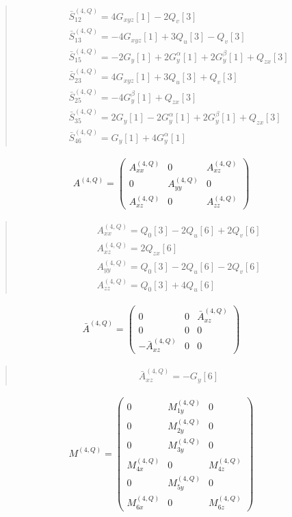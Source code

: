 \documentclass[fleqn,10pt]{jsarticle}
\begin{document}
\begin{quote}
\begin{align*}
& \bar{S}^{(4,Q)}_{12} = 4 G_{xyz}[1] - 2 Q_{v}[3] \\
& \bar{S}^{(4,Q)}_{13} = - 4 G_{xyz}[1] + 3 Q_{u}[3] - Q_{v}[3] \\
& \bar{S}^{(4,Q)}_{15} = - 2 G_{y}[1] + 2 G_{y}^{\alpha}[1] + 2 G_{y}^{\beta}[1] + Q_{zx}[3] \\
& \bar{S}^{(4,Q)}_{23} = 4 G_{xyz}[1] + 3 Q_{u}[3] + Q_{v}[3] \\
& \bar{S}^{(4,Q)}_{25} = - 4 G_{y}^{\beta}[1] + Q_{zx}[3] \\
& \bar{S}^{(4,Q)}_{35} = 2 G_{y}[1] - 2 G_{y}^{\alpha}[1] + 2 G_{y}^{\beta}[1] + Q_{zx}[3] \\
& \bar{S}^{(4,Q)}_{46} = G_{y}[1] + 4 G_{y}^{\alpha}[1]
\end{align*}
\end{quote}
\begin{align*}
A^{(4,Q)} = \begin{pmatrix} A^{(4,Q)}_{xx} & 0 & A^{(4,Q)}_{xz} \\ 0 & A^{(4,Q)}_{yy} & 0 \\ A^{(4,Q)}_{xz} & 0 & A^{(4,Q)}_{zz} \end{pmatrix}
\end{align*}
\begin{quote}
\begin{align*}
& A^{(4,Q)}_{xx} = Q_{0}[3] - 2 Q_{u}[6] + 2 Q_{v}[6] \\
& A^{(4,Q)}_{xz} = 2 Q_{zx}[6] \\
& A^{(4,Q)}_{yy} = Q_{0}[3] - 2 Q_{u}[6] - 2 Q_{v}[6] \\
& A^{(4,Q)}_{zz} = Q_{0}[3] + 4 Q_{u}[6]
\end{align*}
\end{quote}
\begin{align*}
\bar{A}^{(4,Q)} = \begin{pmatrix} 0 & 0 & \bar{A}^{(4,Q)}_{xz} \\ 0 & 0 & 0 \\ - \bar{A}^{(4,Q)}_{xz} & 0 & 0 \end{pmatrix}
\end{align*}
\begin{quote}
\begin{align*}
& \bar{A}^{(4,Q)}_{xz} = - G_{y}[6]
\end{align*}
\end{quote}
\begin{align*}
M^{(4,Q)} = \begin{pmatrix} 0 & M^{(4,Q)}_{1y} & 0 \\ 0 & M^{(4,Q)}_{2y} & 0 \\ 0 & M^{(4,Q)}_{3y} & 0 \\ M^{(4,Q)}_{4x} & 0 & M^{(4,Q)}_{4z} \\ 0 & M^{(4,Q)}_{5y} & 0 \\ M^{(4,Q)}_{6x} & 0 & M^{(4,Q)}_{6z} \end{pmatrix}
\end{align*}
\end{document}

